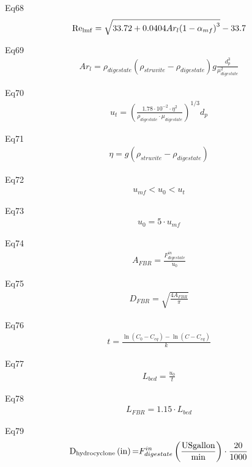 \documentclass[10pt,a4paper]{article}
\begin{document}
Eq68
\begin{align}
	{{\mathop{\rm Re}\nolimits} _{{\rm{l mf}}}} = \sqrt {33.72 + 0.0404A{r_l}{{\left( {1 - {\alpha _{mf}}} \right)}^3}}  - 33.7
\end{align}

Eq69
\begin{align}
	A{r_l} = {\rho _{digestate}}\left( {{\rho _{struvite}} - {\rho _{digestate}}} \right)g\frac{{d_p^3}}{{\mu _{digestate}^2}}
\end{align}

Eq70
\begin{align}
	{u_t} = {\left( {\frac{{1.78 \cdot {{10}^{ - 2}} \cdot {\eta ^2}}}{{{\rho _{digestate}} \cdot {\mu _{digestate}}}}} \right)^{1/3}}{d_p}
\end{align}

Eq71
\begin{align}
	\eta  = g\left( {{\rho _{struvite}} - {\rho _{digestate}}} \right)
\end{align}

Eq72
\begin{align}
	{u_{mf}} < {u_0} < {u_t}
\end{align}

Eq73
\begin{align}
	{u_0} = 5 \cdot {u_{mf}}
\end{align}

Eq74
\begin{align}
	{A_{FBR}} = \frac{{F_{digestate}^{in}}}{{{u_0}}}
\end{align}

Eq75
\begin{align}
	{D_{FBR}} = \sqrt {\frac{{4{A_{FBR}}}}{\pi }}
\end{align}

Eq76
\begin{align}
	t = \frac{{\ln \left( {{C_0} - {C_{eq}}} \right) - \ln \left( {C - {C_{eq}}} \right)}}{k}
\end{align}

Eq77
\begin{align}
	{L_{bed}} = \frac{{{u_0}}}{t}
\end{align}

Eq78
\begin{align}
	{L_{FBR}} = 1.15 \cdot {L_{bed}}
\end{align}

Eq79
\begin{align}
	{{\rm{D}}_{{\rm{hydrocyclone}}}}\left( {{\rm{in}}} \right){\rm{ = }}F_{digestate}^{in}\left( {\frac{{{\rm{US gallon}}}}{{{\rm{min}}}}} \right) \cdot \frac{{20}}{{1000}}
\end{align}
\end{document}
